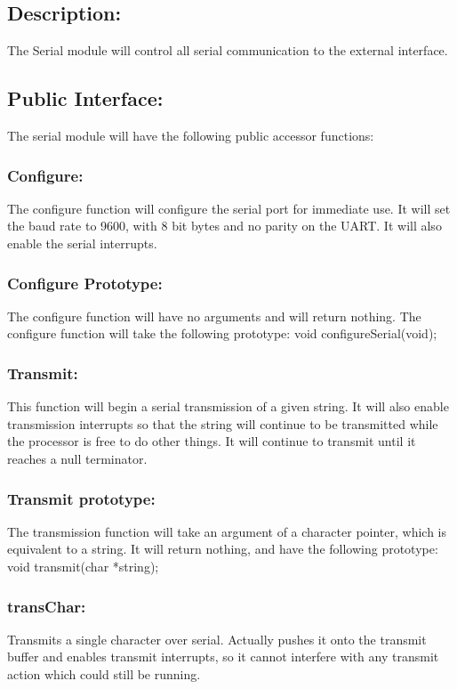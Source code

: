 \documentclass[]{article}
\begin{document}
\subsection{Description:}
The Serial module will control all serial communication to the external interface.

\subsection{Public Interface:}
The serial module will have the following public accessor functions:

\subsubsection{Configure:}
The configure function will configure the serial port for immediate use. It will set the baud rate to 9600, with 8 bit bytes and no parity on the UART. It will also enable the serial interrupts.

\subsubsection{Configure Prototype:}
The configure function will have no arguments and will return nothing. The configure function will take the following prototype: \newline \newline
void configureSerial(void);

\subsubsection{Transmit:}
This function will begin a serial transmission of a given string. It will also enable transmission interrupts so that the string will continue to be transmitted while the processor is free to do other things. It will continue to transmit until it reaches a null terminator.

\subsubsection{Transmit prototype:}
The transmission function will take an argument of a character pointer, which is equivalent to a string. It will return nothing, and have the following prototype: \newline \newline
void transmit(char *string);

\subsubsection{transChar:}
Transmits a single character over serial. Actually pushes it onto the transmit buffer and enables transmit interrupts, so it cannot interfere with any transmit action which could still be running.
\end{document}
